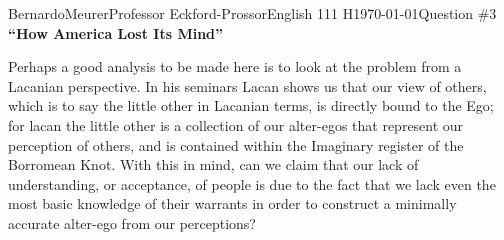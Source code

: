 \documentclass[12pt,letterpaper]{article}
\begin{document}
\begin{mla}{Bernardo}{Meurer}{Professor Eckford-Prossor}{English 111 H}{\today}{Question \#3}
    \noindent\textbf{``How America Lost Its Mind''}

    Perhaps a good analysis to be made here is to look at the problem from a Lacanian perspective.
    In his seminars Lacan shows us that our view of others, which is to say the little other in Lacanian terms, is directly bound to the Ego; for lacan the little other is a collection of our alter-egos that represent our perception of others, and is contained within the Imaginary register of the Borromean Knot.
    With this in mind, can we claim that our lack of understanding, or acceptance, of people is due to the fact that we lack even the most basic knowledge of their warrants in order to construct a minimally accurate alter-ego from our perceptions?
\end{mla}
\end{document}

